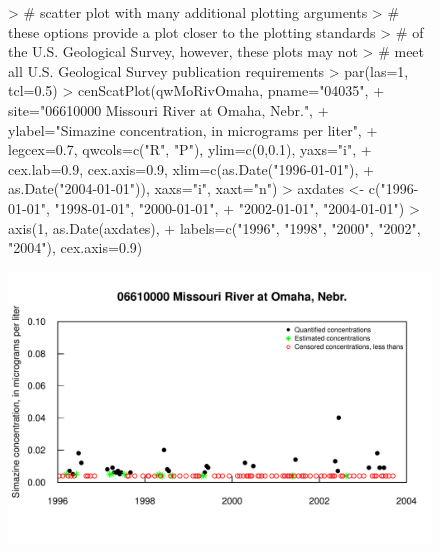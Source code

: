 \documentclass[11pt]{article}
\begin{document}
\begin{figure}[H]
\centering
\begin{Schunk}
\begin{Sinput}
> # scatter plot with many additional plotting arguments
> # these options provide a plot closer to the plotting standards
> # of the U.S. Geological Survey, however, these plots may not 
> # meet all U.S. Geological Survey publication requirements
> par(las=1, tcl=0.5)
> cenScatPlot(qwMoRivOmaha, pname="04035", 
+                        site="06610000 Missouri River at Omaha, Nebr.",
+                        ylabel="Simazine concentration, in micrograms per liter",
+                        legcex=0.7, qwcols=c("R", "P"), ylim=c(0,0.1), yaxs="i", 
+                        cex.lab=0.9, cex.axis=0.9, xlim=c(as.Date("1996-01-01"), 
+                        as.Date("2004-01-01")), xaxs="i", xaxt="n")
> axdates <- c("1996-01-01", "1998-01-01", "2000-01-01", 
+                        "2002-01-01", "2004-01-01")
> axis(1, as.Date(axdates), 
+                        labels=c("1996", "1998", "2000", "2002", "2004"), cex.axis=0.9)
\end{Sinput}
\end{Schunk}
\includegraphics{vignette-003}
\end{figure}
\end{document}

